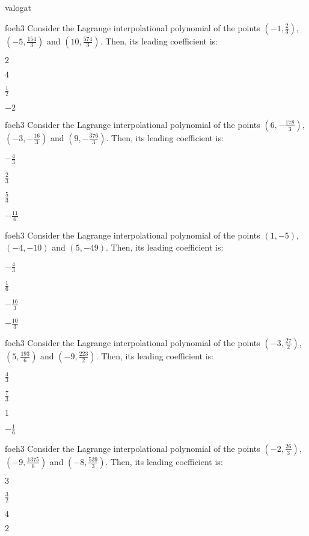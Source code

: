 \documentclass[12pt]{article}
\begin{document}
\begin{quiz}{valogat}
\begin{multi}{foeh3}
Consider the Lagrange interpolational polynomial of the points $(-1,\frac{2}{3})$, $(-5,\frac{154}{3})$ and $(10,\frac{574}{3})$.
Then, its leading coefficient is:
\item* $ 2 $
\item  $ 4 $
\item  $ \frac{1}{2} $
\item  $ -2 $
\end{multi}
\begin{multi}{foeh3}
Consider the Lagrange interpolational polynomial of the points $(6,-\frac{178}{3})$, $(-3,-\frac{16}{3})$ and $(9,-\frac{376}{3})$.
Then, its leading coefficient is:
\item* $ -\frac{4}{3} $
\item  $ \frac{2}{3} $
\item  $ \frac{5}{3} $
\item  $ -\frac{11}{6} $
\end{multi}
\begin{multi}{foeh3}
Consider the Lagrange interpolational polynomial of the points $(1,-5)$, $(-4,-10)$ and $(5,-49)$.
Then, its leading coefficient is:
\item* $ -\frac{4}{3} $
\item  $ \frac{1}{6} $
\item  $ -\frac{16}{3} $
\item  $ -\frac{10}{3} $
\end{multi}
\begin{multi}{foeh3}
Consider the Lagrange interpolational polynomial of the points $(-3,\frac{27}{2})$, $(5,\frac{193}{6})$ and $(-9,\frac{223}{2})$.
Then, its leading coefficient is:
\item* $ \frac{4}{3} $
\item  $ \frac{7}{3} $
\item  $ 1 $
\item  $ -\frac{1}{6} $
\end{multi}
\begin{multi}{foeh3}
Consider the Lagrange interpolational polynomial of the points $(-2,\frac{26}{3})$, $(-9,\frac{1375}{6})$ and $(-8,\frac{539}{3})$.
Then, its leading coefficient is:
\item* $ 3 $
\item  $ \frac{3}{2} $
\item  $ 4 $
\item  $ 2 $
\end{multi}

\end{quiz}
\end{document}
